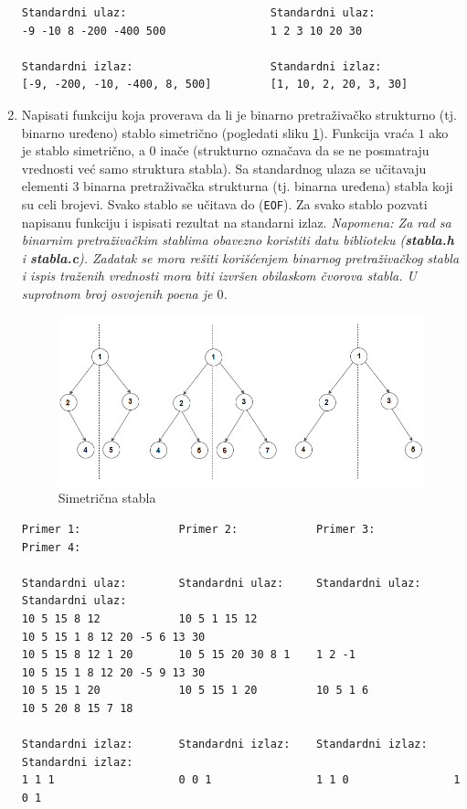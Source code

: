 \begin{enumerate}
\begin{verbatim}
Standardni ulaz:                      Standardni ulaz:
-9 -10 8 -200 -400 500                1 2 3 10 20 30

Standardni izlaz:                     Standardni izlaz:
[-9, -200, -10, -400, 8, 500]         [1, 10, 2, 20, 3, 30]
\end{verbatim}

\item Napisati funkciju koja proverava da li je binarno pretraživačko strukturno (tj. binarno uređeno) stablo simetrično (pogledati sliku \ref{fig:slika1}). Funkcija vraća $1$ ako je stablo simetrično, a $0$ inače (strukturno označava da se ne posmatraju vrednosti već samo struktura stabla). Sa standardnog ulaza se učitavaju elementi 3 binarna pretraživačka strukturna (tj. binarna uređena) stabla koji su celi brojevi. Svako stablo se učitava do (\texttt{EOF}). Za svako stablo pozvati napisanu funkciju i ispisati rezultat na standarni izlaz. 
\textit{Napomena: Za rad sa binarnim pretraživačkim stablima obavezno koristiti datu biblioteku (\textbf{stabla.h} i \textbf{stabla.c}). Zadatak se mora rešiti korišćenjem binarnog pretraživačkog stabla i ispis traženih vrednosti mora biti izvršen obilaskom čvorova stabla. U suprotnom broj osvojenih poena je $0$.}

\begin{figure}[h!]
    \centering
    \begin{minipage}[b]{0.50\textwidth}
        \includegraphics[width=\textwidth]{./Symmetric-Binary-Tree.png}
        \caption{Simetrična stabla}
        \label{fig:slika1}
    \end{minipage}
\end{figure}

\begin{verbatim}
Primer 1:               Primer 2:            Primer 3:            Primer 4:                

Standardni ulaz:        Standardni ulaz:     Standardni ulaz:     Standardni ulaz: 
10 5 15 8 12            10 5 1 15 12                              10 5 15 1 8 12 20 -5 6 13 30
10 5 15 8 12 1 20       10 5 15 20 30 8 1    1 2 -1               10 5 15 1 8 12 20 -5 9 13 30
10 5 15 1 20            10 5 15 1 20         10 5 1 6             10 5 20 8 15 7 18

Standardni izlaz:       Standardni izlaz:    Standardni izlaz:    Standardni izlaz:        
1 1 1                   0 0 1                1 1 0                1 0 1 
\end{verbatim}  
\end{enumerate} 

